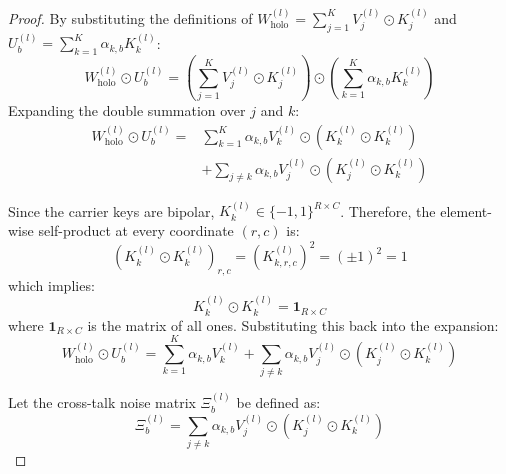 \documentclass{article}
\theoremstyle{plain}
\theoremstyle{definition}
\theoremstyle{remark}
\begin{document}
\begin{proof}
By substituting the definitions of $W_{\text{holo}}^{(l)} = \sum_{j=1}^K V_j^{(l)} \odot K_j^{(l)}$ and $U_b^{(l)} = \sum_{k=1}^K \alpha_{k, b} K_k^{(l)}$:
\begin{equation}
W_{\text{holo}}^{(l)} \odot U_b^{(l)} = \left( \sum_{j=1}^K V_j^{(l)} \odot K_j^{(l)} \right) \odot \left( \sum_{k=1}^K \alpha_{k, b} K_k^{(l)} \right)
\end{equation}
Expanding the double summation over $j$ and $k$:
\begin{align}
W_{\text{holo}}^{(l)} \odot U_b^{(l)} = &\sum_{k=1}^K \alpha_{k, b} V_k^{(l)} \odot \left( K_k^{(l)} \odot K_k^{(l)} \right) \nonumber \\
&+ \sum_{j \neq k} \alpha_{k, b} V_j^{(l)} \odot \left( K_j^{(l)} \odot K_k^{(l)} \right)
\end{align}

Since the carrier keys are bipolar, $K_k^{(l)} \in \{-1, 1\}^{R \times C}$. Therefore, the element-wise self-product at every coordinate $(r, c)$ is:
\begin{equation}
\left( K_k^{(l)} \odot K_k^{(l)} \right)_{r, c} = \left( K_{k, r, c}^{(l)} \right)^2 = (\pm 1)^2 = 1
\end{equation}
which implies:
\begin{equation}
K_k^{(l)} \odot K_k^{(l)} = \mathbf{1}_{R \times C}
\end{equation}
where $\mathbf{1}_{R \times C}$ is the matrix of all ones. Substituting this back into the expansion:
\begin{equation}
W_{\text{holo}}^{(l)} \odot U_b^{(l)} = \sum_{k=1}^K \alpha_{k, b} V_k^{(l)} + \sum_{j \neq k} \alpha_{k, b} V_j^{(l)} \odot \left( K_j^{(l)} \odot K_k^{(l)} \right)
\end{equation}

Let the cross-talk noise matrix $\Xi_b^{(l)}$ be defined as:
\begin{equation}
\Xi_b^{(l)} = \sum_{j \neq k} \alpha_{k, b} V_j^{(l)} \odot \left( K_j^{(l)} \odot K_k^{(l)} \right)
\end{equation}


\end{proof}
\end{document}
